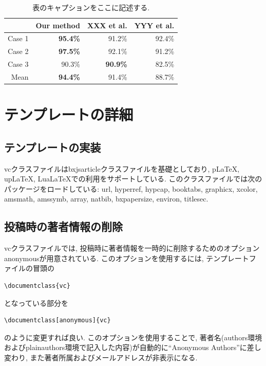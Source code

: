 \documentclass[anonymous]{vc}
\begin{document}
\begin{table}
  \centering
  \caption{表のキャプションをここに記述する.}
  \label{tab:accuracy}
  \begin{tabular}{@{}rrrr@{}}
    \toprule
    & Our method & XXX et al. & YYY et al. \\
    \midrule
    Case 1 & \textbf{95.4\%} &         91.2\%  & 92.4\% \\
    Case 2 & \textbf{97.5\%} &         92.1\%  & 91.2\% \\
    Case 3 &         90.3\%  & \textbf{90.9\%} & 82.5\% \\
    \midrule
    Mean   & \textbf{94.4\%} &         91.4\%  & 88.7\% \\
    \bottomrule
  \end{tabular}
\end{table}

\section{テンプレートの詳細}

\subsection{テンプレートの実装}

\textsf{vc}クラスファイルは\textsf{bxjsarticle}クラスファイルを基礎としており, pLaTeX, upLaTeX, LuaLaTeXでの利用をサポートしている.
このクラスファイルでは次のパッケージをロードしている:
\textsf{url},
\textsf{hyperref},
\textsf{hypcap},
\textsf{booktabs},
\textsf{graphicx},
\textsf{xcolor},
\textsf{amsmath},
\textsf{amssymb},
\textsf{array},
\textsf{natbib},
\textsf{bxpapersize},
\textsf{environ},
\textsf{titlesec}.

\subsection{投稿時の著者情報の削除}

\textsf{vc}クラスファイルでは, 投稿時に著者情報を一時的に削除するためのオプション\textsf{anonymous}が用意されている.
このオプションを使用するには, テンプレートファイルの冒頭の
\begin{verbatim}
\documentclass{vc}
\end{verbatim}
となっている部分を
\begin{verbatim}
\documentclass[anonymous]{vc}
\end{verbatim}
のように変更すれば良い.
このオプションを使用することで, 著者名(\textsf{authors}環境および\textsf{plainauthors}環境で記入した内容)が自動的に``Anonymous Authors''に差し変わり, また著者所属およびメールアドレスが非表示になる.
\end{document}
